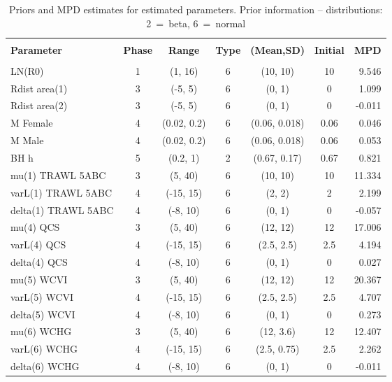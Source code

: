 \setlength{\tabcolsep}{2pt}
\begin{table}[!h]
\centering
\caption{Priors and MPD estimates for estimated parameters. Prior information -- distributions: 2~=~beta, 6~=~normal}
\label{tab:parest}
\usefont{\encodingdefault}{\familydefault}{\seriesdefault}{\shapedefault}\small
\begin{tabular}{lcccccr}
\hline \\ [-1.5ex]
{\bf Parameter} & {\bf Phase} & {\bf Range} & {\bf Type} & {\bf (Mean,SD)} & {\bf Initial} & {\bf MPD} \\ [1ex]
\hline \\ [-1.5ex]
LN(R0) & 1 & (1, 16) & 6 & (10, 10) & 10 & 9.546 \\
Rdist area(1) & 3 & (-5, 5) & 6 & (0, 1) & 0 & 1.099 \\
Rdist area(2) & 3 & (-5, 5) & 6 & (0, 1) & 0 & -0.011 \\
M Female & 4 & (0.02, 0.2) & 6 & (0.06, 0.018) & 0.06 & 0.046 \\
M Male & 4 & (0.02, 0.2) & 6 & (0.06, 0.018) & 0.06 & 0.053 \\
BH h & 5 & (0.2, 1) & 2 & (0.67, 0.17) & 0.67 & 0.821 \\
mu(1) TRAWL 5ABC & 3 & (5, 40) & 6 & (10, 10) & 10 & 11.334 \\
varL(1) TRAWL 5ABC & 4 & (-15, 15) & 6 & (2, 2) & 2 & 2.199 \\
delta(1) TRAWL 5ABC & 4 & (-8, 10) & 6 & (0, 1) & 0 & -0.057 \\
mu(4) QCS & 3 & (5, 40) & 6 & (12, 12) & 12 & 17.006 \\
varL(4) QCS & 4 & (-15, 15) & 6 & (2.5, 2.5) & 2.5 & 4.194 \\
delta(4) QCS & 4 & (-8, 10) & 6 & (0, 1) & 0 & 0.027 \\
mu(5) WCVI & 3 & (5, 40) & 6 & (12, 12) & 12 & 20.367 \\
varL(5) WCVI & 4 & (-15, 15) & 6 & (2.5, 2.5) & 2.5 & 4.707 \\
delta(5) WCVI & 4 & (-8, 10) & 6 & (0, 1) & 0 & 0.273 \\
mu(6) WCHG & 3 & (5, 40) & 6 & (12, 3.6) & 12 & 12.407 \\
varL(6) WCHG & 4 & (-15, 15) & 6 & (2.5, 0.75) & 2.5 & 2.262 \\
delta(6) WCHG & 4 & (-8, 10) & 6 & (0, 1) & 0 & -0.011 \\

\end{tabular}
\end{table}
